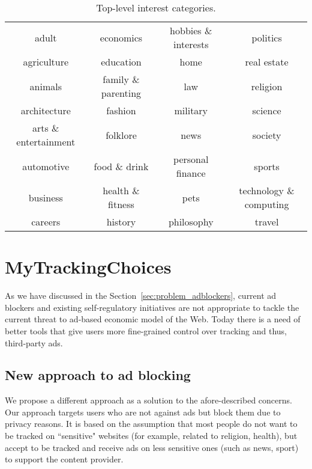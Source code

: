\documentclass[conference]{IEEEtran}
\begin{document}
\begin{table*}[tb!]
\centering
\caption{Top-level interest categories.}
\label{tab:TopLevelCategories}
\footnotesize
  \begin{tabular}{cccc}
    \toprule
        adult                                & economics                       & hobbies \& interests                         &  politics \\
    agriculture                     &  education                                     &  home                                     & real estate \\
    animals                         & family \& parenting                              & law                              & religion \\
    architecture                  & fashion                                                  & military                                         & science\\
    arts \& entertainment  & folklore                                         & news                                 & society \\
    automotive                    & food \& drink                                 & personal finance                                                 & sports\\
    business                        & health \& fitness                     & pets                           & technology \& computing\\
    careers                          & history                               & philosophy                       & travel\\
    \bottomrule
  \end{tabular}
\end{table*}




\section{MyTrackingChoices}
\label{sec:mytrackingchoices}
As we have discussed in the Section~\ref{sec:problem_adblockers}, current ad blockers and existing self-regulatory initiatives are not appropriate to tackle the current threat to ad-based economic model of the Web.
Today there is a need of better tools that give users more fine-grained control over tracking and thus, third-party ads.


\subsection{New approach to ad blocking}
We propose a different approach as a solution to the afore-described concerns.
Our approach targets users who are not against ads but block them due to privacy reasons.
It is based on the assumption that most people do not want to be tracked on ``sensitive" websites (for example, related to religion, health),  
but accept to be tracked and receive ads on less sensitive ones (such as news, sport) to support the content provider.
\end{document}
